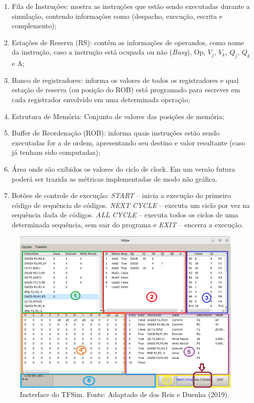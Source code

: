 \documentclass[12pt]{article}
\begin{document}
\begin{enumerate}
  \item Fila de Instruções: mostra as instruções que estão sendo executadas durante a simulação, contendo informações como (despacho, execução, escrita e complemento);
  \item Estações de Reserva (RS): contém as informações de operandos, como nome da instrução, caso a instrução está ocupada ou não (\textit{Busy}), Op, $V_j$, $V_k$, $Q_j$, $Q_k$ e A;
  \item Banco de registradores: informa os valores de todos os registradores e qual estação de reserva (ou posição do ROB) está programado para escrever em cada registrador envolvido em uma determinada operação;
  \item Estrutura de Memória: Conjunto de valores das posições de memória;
  \item Buffer de Reordenação (ROB): informa quais instruções estão sendo executadas for a de ordem, apresentando seu destino e valor resultante (caso já tenham sido computadas);
  \item Área onde são exibidos os valores do ciclo de clock. Em um versão futura poderá ser trazida as métricas implementadas de modo não gráfica.
  \item Botões de controle de execução: \textit{START} – inicia a execução do primeiro código de sequência de códigos. \textit{NEXT CYCLE} – executa um ciclo por vez na sequência dada de códigos. \textit{ALL CYCLE} – executa todos os ciclos de uma determinada sequência, sem sair do programa e \textit{EXIT} – encerra a execução.
\end{enumerate}

\begin{figure}[h]
  \centering
  \includegraphics[width=.7\textwidth]{img/fig_tfsim.png}
  \caption{Insterface do TFSim. Fonte: Adaptado de dos Reis e Duenha (2019).}
  \label{fig_tfsim}
\end{figure}
\end{document}
